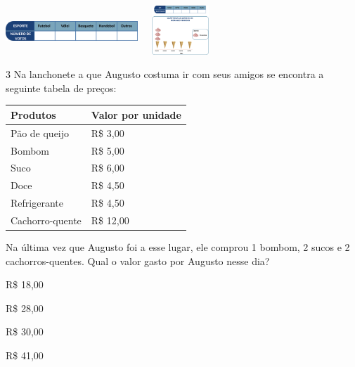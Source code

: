 \begin{multicols}{2}
\begin{escolha}
\item
\includegraphics[width=1.95850in,height=0.69173in]{media/image85.png}\includegraphics[width=1.26678in,height=0.72506in]{media/image84.png}
\end{escolha}


\num{3} Na lanchonete a que Augusto costuma ir com seus amigos se encontra a
seguinte tabela de preços:

\begin{longtable}[]{@{}ll@{}}
\toprule
Produtos & Valor por unidade\tabularnewline
\midrule
\endhead
Pão de queijo & R\$ 3,00\tabularnewline
Bombom & R\$ 5,00\tabularnewline
Suco & R\$ 6,00\tabularnewline
Doce & R\$ 4,50\tabularnewline
Refrigerante & R\$ 4,50\tabularnewline
Cachorro-quente & R\$ 12,00\tabularnewline
\bottomrule
\end{longtable}

Na última vez que Augusto foi a esse lugar, ele comprou 1 bombom, 2
sucos e 2 cachorros-quentes. Qual o valor gasto por Augusto nesse dia?

\begin{minipage}{.5\textwidth}
\begin{escolha}

\item
  R\$ 18,00
\item
  R\$ 28,00
\item
  R\$ 30,00
\item
  R\$ 41,00
\end{escolha}
\end{minipage}


\end{multicols}
